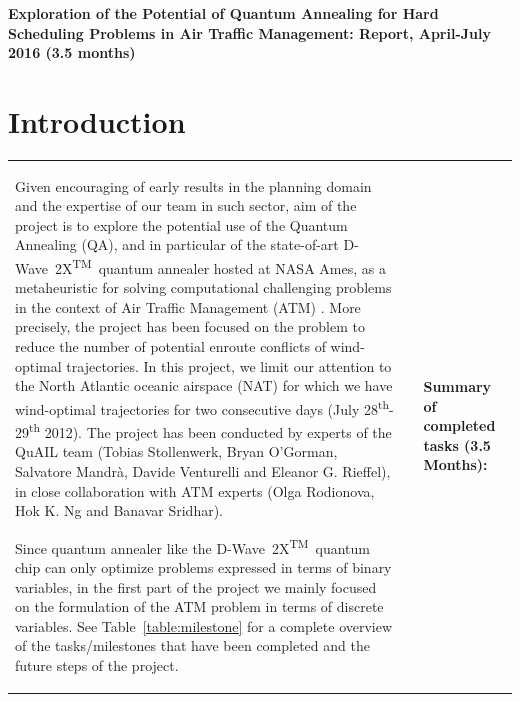 \documentclass[9pt]{extarticle}
\renewcommand{\tablename}{Table}
\newcommand{\DW}{\mbox{D-Wave 2X\textsuperscript{TM}}~}
\begin{document}
\begin{center}\Large
\textbf{Exploration of the Potential of Quantum Annealing for Hard Scheduling
Problems in Air Traffic Management: Report, April-July 2016 (3.5 months)}
\end{center}

\def\changemargin#1#2{\list{}{\rightmargin#2\leftmargin#1}\item[]}
\let\endchangemargin=\endlist 

\section*{Introduction}\label{sec:intro}

\hspace{-0.23cm}\begin{tabular}{p{9cm}p{0.1cm}p{8cm}}
\vspace{-5.3cm}
Given encouraging of early results in the planning domain \cite{rieffel:15,venturelli:15}
and the expertise of our team in such sector, 
aim of the project is to explore the potential use of the Quantum Annealing (QA), and in particular of the state-of-art \DW quantum annealer hosted at NASA Ames, 
as a metaheuristic for solving computational challenging problems in the context of
Air Traffic Management (ATM) \cite{rodionova:16, rodionova:thesis15}. More precisely, the project has been focused on the problem to reduce the number
of potential enroute conflicts of wind-optimal trajectories. 
In this project, we limit our attention to the North Atlantic oceanic airspace (NAT) for which we have wind-optimal trajectories
for two consecutive days (July 28\textsuperscript{th}-29\textsuperscript{th} 2012). The project has been conducted by experts of the QuAIL team
(Tobias Stollenwerk, Bryan O'Gorman, Salvatore Mandr\`a, Davide Venturelli and Eleanor G. Rieffel), in close collaboration with
ATM experts (Olga Rodionova, Hok K. Ng and Banavar Sridhar).

\vspace{0.1cm}\hspace{0.4cm} Since quantum annealer like the \DW quantum chip can only optimize problems expressed in terms of binary variables,
in the first part of the project we mainly focused on the formulation of the ATM problem in terms of discrete variables.
See \tablename~\ref{table:milestone} for a complete overview of the tasks/milestones that have been completed and the future steps
of the project.
&
&
\multicolumn{1}{p{8cm}}{
\cellcolor{gray!20}
\begin{minipage}{8cm}
\vspace{0.4cm}
\textbf{Summary of completed tasks (3.5 Months):}


\end{minipage}}
\end{tabular}
\end{document}
